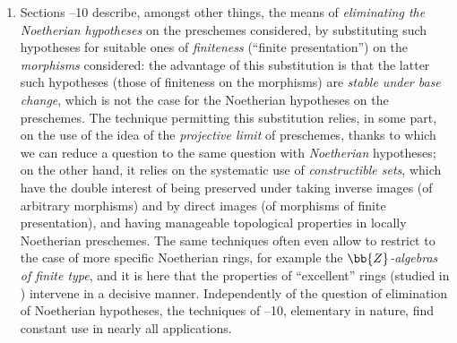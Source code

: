 \documentclass[openany,oneside]{amsbook}
\theoremstyle{ega-env-style}
\theoremstyle{ega-thm-env-style}
\theoremstyle{ega-defn-env-style}
\def\unsure#1{#1 {\color{red}(?)}}
\newcommand{\oldpage}[2][]{{\marginnote{\normalfont{\textbf{#1}~|~#2}}}\ignorespaces}
\begin{document}
\begin{enumerate}
\begin{enumerate}
        Recall that  constitutes a ``\unsure{delicate}'' theory of Noetherian local rings, not much used in what follows in the chapter.
      \item[(c3)] Sections \textsection{}--10 describe, amongst other things, the means of \emph{eliminating the Noetherian hypotheses} on the preschemes considered, by substituting such hypotheses for suitable ones of \emph{finiteness} (``finite presentation'') on the \emph{morphisms} considered: the advantage of this substitution is that the latter such hypotheses (those of finiteness on the morphisms) are \emph{stable under base change}, which is not the case for the Noetherian hypotheses on the preschemes.
        The technique permitting this substitution relies, in some part, on the use of the idea of the \emph{projective limit} of preschemes, thanks to which we can reduce a question to the same question with \emph{Noetherian} hypotheses; on the other hand, it relies on the systematic use of \emph{constructible sets}, which have the double interest of being preserved under taking inverse images (of arbitrary morphisms)
\oldpage[IV-1]{224}
        and by direct images (of morphisms of finite presentation), and having manageable topological properties in locally Noetherian preschemes.
        The same techniques often even allow to restrict to the case of more specific Noetherian rings, for example the \emph{$\bb{Z}$-algebras of finite type}, and it is here that the properties of ``excellent'' rings (studied in ) intervene in a decisive manner.
        Independently of the question of elimination of Noetherian hypotheses, the techniques of \textsection{}--10, elementary in nature, find constant use in nearly all applications.
    \end{enumerate}
\end{enumerate}































\end{document}

